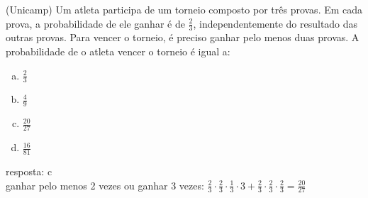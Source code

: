 \begin{ex}
 (Unicamp) Um atleta participa de um torneio composto por três provas. Em cada prova, a probabilidade de ele ganhar é de $\frac{2}{3}$, independentemente do resultado das outras provas. Para vencer o torneio, é preciso ganhar pelo menos duas provas. A probabilidade de o atleta vencer o torneio é igual a:
   \begin{enumerate}   [(a)]
       \item $\frac{2}{3}$
       \item $\frac{4}{9}$
       \item $\frac{20}{27}$
       \item $\frac{16}{81}$
   \end{enumerate}
     \begin{sol}
      resposta: c \\
      ganhar pelo menos 2 vezes ou ganhar 3 vezes: $\frac{2}{3}\cdot\frac{2}{3}\cdot\frac{1}{3}\cdot3+\frac{2}{3}\cdot\frac{2}{3}\cdot\frac{2}{3}=\frac{20}{27}$
     \end{sol}
 \end{ex}